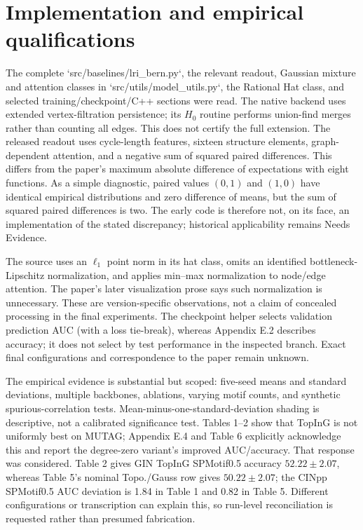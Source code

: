 \documentclass[10pt]{article}
\begin{document}
\section*{Implementation and empirical qualifications}
The complete `src/baselines/lri\_bern.py`, the relevant readout, Gaussian mixture and attention classes in `src/utils/model\_utils.py`, the Rational Hat class, and selected training/checkpoint/C++ sections were read. The native backend uses extended vertex-filtration persistence; its \(H_0\) routine performs union-find merges rather than counting all edges. This does not certify the full extension. The released readout uses cycle-length features, sixteen structure elements, graph-dependent attention, and a negative sum of squared paired differences. This differs from the paper’s maximum absolute difference of expectations with eight functions. As a simple diagnostic, paired values \((0,1)\) and \((1,0)\) have identical empirical distributions and zero difference of means, but the sum of squared paired differences is two. The early code is therefore not, on its face, an implementation of the stated discrepancy; historical applicability remains Needs Evidence.\par
The source uses an \(\ell_1\) point norm in its hat class, omits an identified bottleneck-Lipschitz normalization, and applies min–max normalization to node/edge attention. The paper’s later visualization prose says such normalization is unnecessary. These are version-specific observations, not a claim of concealed processing in the final experiments. The checkpoint helper selects validation prediction AUC (with a loss tie-break), whereas Appendix E.2 describes accuracy; it does not select by test performance in the inspected branch. Exact final configurations and correspondence to the paper remain unknown.\par
The empirical evidence is substantial but scoped: five-seed means and standard deviations, multiple backbones, ablations, varying motif counts, and synthetic spurious-correlation tests. Mean-minus-one-standard-deviation shading is descriptive, not a calibrated significance test. Tables 1–2 show that TopInG is not uniformly best on MUTAG; Appendix E.4 and Table 6 explicitly acknowledge this and report the degree-zero variant’s improved AUC/accuracy. That response was considered. Table 2 gives GIN TopInG SPMotif0.5 accuracy \(52.22\pm2.07\), whereas Table 5’s nominal Topo./Gauss row gives \(50.22\pm2.07\); the CINpp SPMotif0.5 AUC deviation is 1.84 in Table 1 and 0.82 in Table 5. Different configurations or transcription can explain this, so run-level reconciliation is requested rather than presumed fabrication.\par
\end{document}
